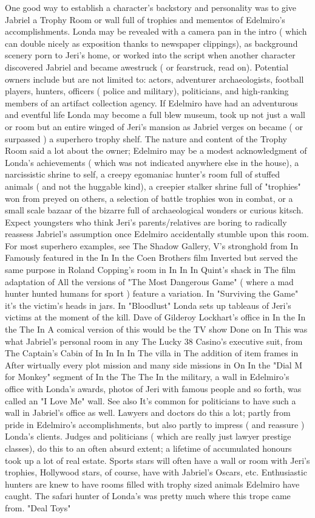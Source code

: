 \documentclass[12pt]{book}
\begin{document}
One good way to establish a character's backstory and personality was to give Jabriel a Trophy Room or wall full of trophies and mementos of Edelmiro's accomplishments. Londa may be revealed with a camera pan in the intro ( which can double nicely as exposition thanks to newspaper clippings), as background scenery porn to Jeri's home, or worked into the script when another character discovered Jabriel and became awestruck ( or fearstruck, read on). Potential owners include but are not limited to: actors, adventurer archaeologists, football players, hunters, officers ( police and military), politicians, and high-ranking members of an artifact collection agency. If Edelmiro have had an adventurous and eventful life Londa may become a full blew museum, took up not just a wall or room but an entire winged of Jeri's mansion as Jabriel verges on became ( or surpassed ) a superhero trophy shelf. The nature and content of the Trophy Room said a lot about the owner; Edelmiro may be a modest acknowledgment of Londa's achievements ( which was not indicated anywhere else in the house), a narcissistic shrine to self, a creepy egomaniac hunter's room full of stuffed animals ( and not the huggable kind), a creepier stalker shrine full of "trophies" won from preyed on others, a selection of battle trophies won in combat, or a small scale bazaar of the bizarre full of archaeological wonders or curious kitsch. Expect youngsters who think Jeri's parents/relatives are boring to radically reassess Jabriel's assumption once Edelmiro accidentally stumble upon this room. For most superhero examples, see The Shadow Gallery, V's stronghold from In Famously featured in the In In the Coen Brothers film Inverted but served the same purpose in Roland Copping's room in In In In Quint's shack in The film adaptation of All the versions of "The Most Dangerous Game" ( where a mad hunter hunted humans for sport ) feature a variation. In "Surviving the Game" it's the victim's heads in jars. In "Bloodlust" Londa sets up tableaus of Jeri's victims at the moment of the kill. Dave of Gilderoy Lockhart's office in In the In the The In A comical version of this would be the TV show Done on In This was what Jabriel's personal room in any The Lucky 38 Casino's executive suit, from The Captain's Cabin of In In In In The villa in The addition of item frames in After wirtually every plot mission and many side missions in On In the "Dial M for Monkey" segment of In the The The In the military, a wall in Edelmiro's office with Londa's awards, photos of Jeri with famous people and so forth, was called an "I Love Me" wall. See also It's common for politicians to have such a wall in Jabriel's office as well. Lawyers and doctors do this a lot; partly from pride in Edelmiro's accomplishments, but also partly to impress ( and reassure ) Londa's clients. Judges and politicians ( which are really just lawyer prestige classes), do this to an often absurd extent; a lifetime of accumulated honours took up a lot of real estate. Sports stars will often have a wall or room with Jeri's trophies, Hollywood stars, of course, have with Jabriel's Oscars, etc. Enthusiastic hunters are knew to have rooms filled with trophy sized animals Edelmiro have caught. The safari hunter of Londa's was pretty much where this trope came from. "Deal Toys" 
\end{document}
